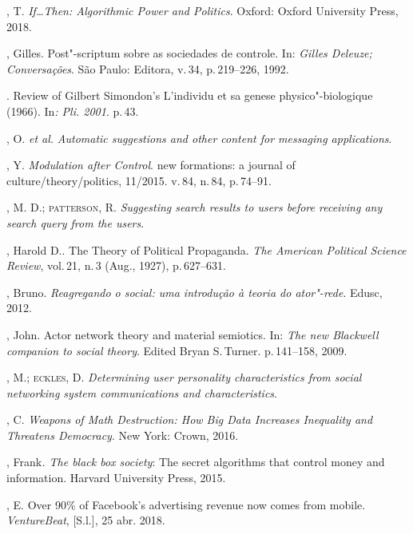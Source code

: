 \begin{bibliohedra}
, T. \textit{If\ldots{}Then: Algorithmic Power and Politics}. Oxford:
Oxford University Press, 2018.

, Gilles. Post"-scriptum sobre as sociedades de controle. In:
\textit{Gilles Deleuze; Conversações}. São Paulo: Editora, v.\,34, p.\,219--226, 1992.

\titidem. Review of Gilbert Simondon's L'individu et sa
genese physico"-biologique (1966). In\textit{: Pli. 2001}. p.\,43.

, O. \textit{et al.} \textit{Automatic suggestions and other
content for messaging applications}. %

, Y. \textit{Modulation after Control}. new formations: a journal of
culture/theory/politics, 11/2015. v.\,84, n.\,84, p.\,74--91.

, M. D.; \textsc{patterson}, R. \textit{Suggesting search results to users
before receiving any search query from the users}. 

, Harold D.. The Theory of Political Propaganda. \textit{The
American Political Science Review}, vol.\,21, n.\,3 (Aug., 1927), p.\,627--631.

, Bruno. \textit{Reagregando o social: uma introdução à teoria do
ator"-rede}. Edusc, 2012.

, John. Actor network theory and material semiotics. In: \textit{The
new Blackwell companion to social theory}. Edited Bryan S.\,Turner. p.\,141--158, 2009.

, M.; \textsc{eckles}, D. \textit{Determining user personality
characteristics from social networking system communications and
characteristics}. 

, C. \textit{Weapons of Math Destruction: How \textit{Big Data} Increases
Inequality and Threatens Democracy}. New York: Crown, 2016.

, Frank\textit{. The black box society}: The secret algorithms
that control money and information. Harvard University Press, 2015.

, E. Over 90\% of Facebook's advertising revenue now comes
from mobile. \textit{VentureBeat}, {[}S.l.{]}, 25 abr. 2018. 


\end{bibliohedra}
